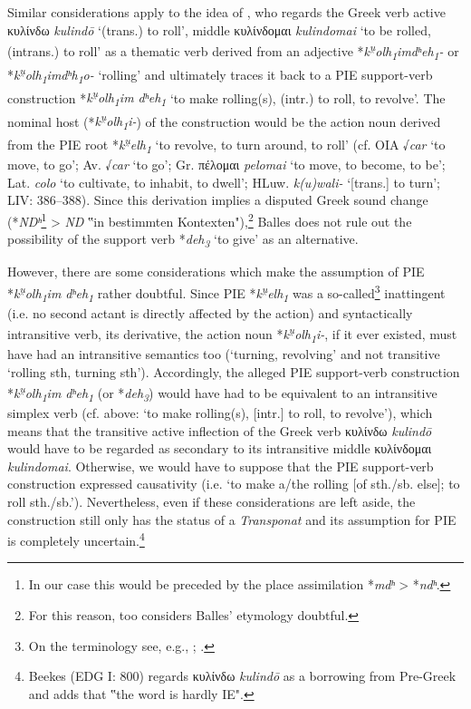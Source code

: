 \documentclass[output=paper,colorlinks,citecolor=brown]{langscibook}
\begin{document}
Similar considerations apply to the idea of \citet[21--22]{Balles2009}, who regards the Greek verb active κυλίνδω \textit{kulindō} ‘(trans.) to roll’, middle κυλίνδομαι \textit{kulindomai} ‘to be rolled, (intrans.) to roll’ as a thematic verb derived from an adjective *\textit{k\textsuperscript{u̯}olh\textsubscript{1}imdʰeh\textsubscript{1}-} or *\textit{k\textsuperscript{u̯}olh\textsubscript{1}imdʰh\textsubscript{1}o-} ‘rolling’ and ultimately traces it back to a PIE support-verb construction *\textit{k\textsuperscript{u̯}olh\textsubscript{1}im dʰeh\textsubscript{1}} ‘to make rolling(s), (intr.) to roll, to revolve’. The nominal host (*\textit{k\textsuperscript{u̯}olh\textsubscript{1}i-}) of the construction would be the action noun derived from the PIE root *\textit{k\textsuperscript{u̯}elh\textsubscript{1}} ‘to revolve, to turn around, to roll’ (cf. OIA √\textit{car} ‘to move, to go’; Av. √\textit{car} ‘to go’; Gr. πέλομαι \textit{pelomai} ‘to move, to become, to be’; Lat. \textit{colo} ‘to cultivate, to inhabit, to dwell’; HLuw. \textit{k(u)wali-} ‘[trans.] to turn’; LIV: 386–388). Since this derivation implies a disputed Greek sound change (*\textit{{NDʰ}}\footnote{In our case this would be preceded by the place assimilation *\textit{mdʰ} > *\textit{ndʰ}.}        > \textit{{ND}} ‟in bestimmten Kontexten"),\footnote{For this reason, \citet[128--129]{Schutzeichel2014} too considers Balles’ etymology doubtful.}  Balles does not rule out the possibility of the support verb *\textit{deh\textsubscript{3}} ‘to give’ as an alternative.

However, there are some considerations which make the assumption of PIE *\textit{k\textsuperscript{u̯}olh\textsubscript{1}im dʰeh\textsubscript{1}} rather doubtful. Since PIE *\textit{k\textsuperscript{u̯}elh\textsubscript{1}} was a so-called\footnote{On the terminology see, e.g., \citet[25--29]{Gotō1987}; \citet[6--7]{Kümmel2000}.}      inattingent (i.e. no second actant is directly affected by the action) and syntactically intransitive verb, its derivative, the action noun *\textit{k\textsuperscript{u̯}olh\textsubscript{1}i-}, if it ever existed, must have had an intransitive semantics too (‘turning, revolving’ and not transitive ‘rolling sth, turning sth’). Accordingly, the alleged PIE support-verb construction *\textit{k\textsuperscript{u̯}olh\textsubscript{1}im dʰeh\textsubscript{1}} (or *\textit{deh\textsubscript{3}}) would have had to be equivalent to an intransitive simplex verb (cf. above: ‘to make rolling(s), [intr.] to roll, to revolve’), which means that the transitive active inflection of the Greek verb κυλίνδω \textit{kulindō} would have to be regarded as secondary to its intransitive middle κυλίνδομαι \textit{kulindomai}. Otherwise, we would have to suppose that the PIE support-verb construction expressed causativity (i.e. ‘to make a/the rolling [of sth./sb. else]; to roll sth./sb.’). Nevertheless, even if these considerations are left aside, the construction still only has the status of a \textit{Transponat} and its assumption for PIE is completely uncertain.\footnote{Beekes (EDG I: 800) regards κυλίνδω \textit{kulindō} as a borrowing from Pre-Greek and adds that ‟the word is hardly IE".}
\end{document}
